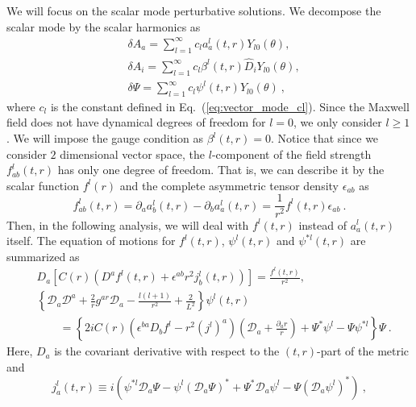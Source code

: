 \documentclass[a4paper,11pt]{article}
\begin{document}
    We will focus on the scalar mode perturbative solutions. We decompose the scalar mode by the scalar harmonics as 
    \begin{align}
        \label{eq:scalar_mode_gauge_field}
        &\delta A_a
        =\sum_{l=1}^\infty c_l a_a^{l}(t,r) Y_{l0}(\theta),\\
        &\delta A_i = \sum_{l=1}^\infty c_l \beta^{l}(t,r) \hat{D}_i Y_{l0}(\theta),\label{eq:scalar_mode_beta}\\
        &\delta\Psi
        =\sum_{l=1}^\infty c_l \psi^{l}(t,r) Y_{l0}(\theta)\ ,
        \label{eq:scalar_mode_scalar_field}
    \end{align}
    where $c_l$ is the constant defined in Eq.~(\ref{eq:vector_mode_cl}). Since the Maxwell field does not have dynamical degrees of freedom for $l=0$, we only consider $l\geq 1$. We will impose the gauge condition as $\beta^{l}(t,r)=0$. 
    Notice that since we consider $2$ dimensional vector space, the $l$-component of the field strength $f^l_{ab}(t,r)$ has only one degree of freedom. That is, we can describe it by the scalar function $f^l(r)$ and the complete asymmetric tensor density $\epsilon_{ab}$ as
    \begin{equation}
    \label{eq:elemag_tensor_scalar}
        f^l_{ab}(t,r)
        = \partial_a a^l_b(t,r)-\partial_b a^l_a(t,r)
        =\frac{1}{r^2} f^l(t,r)\epsilon_{ab}\ .
    \end{equation}
    Then, in the following analysis, we will deal with $f^l(t,r)$ instead of $a_a^{l}(t,r)$ itself. The equation of motions for $f^l(t,r)$, $\psi^l(t,r)$ and $\psi^{*l}(t,r)$ are summarized as
    \begin{align}
        & D_a\left[C(r)\left(D^a f^l(t,r)+\epsilon^{ab}r^2 j^l_b(t,r) \right)\right]=\frac{f^l(t,r)}{r^2},\label{eq:scalar_mode_Maxwell_b} \\
        &\left\{
        \mathcal{D}_a\mathcal{D}^a + \frac{2}{r}g^{ar}\mathcal{D}_a - \frac{l(l+1)}{r^2} + \frac{2}{L^2}
        \right\}\psi^l(t,r) \nonumber\\
        &\qquad
        =\left\{
        2iC(r)\left(\epsilon^{ba}D_b f^l-r^2 (j^l)^a\right) \left(\mathcal{D}_a+\frac{\partial_a r}{r}\right)
        +\Psi^*\psi^l-\Psi\psi^{*l}\right\}\Psi\ .
        \label{eq:scalar_mode_KG}
    \end{align}
    Here, $D_a$ is the covariant derivative with respect to the $(t,r)$-part of the metric and  
    \begin{equation}
        \label{eq:scalar_mode_j_a}
        j^l_a(t,r) \equiv i\left(\psi^{*l}\mathcal{D}_a\Psi-\psi^l (\mathcal{D}_a\Psi)^*+\Psi^*\mathcal{D}_a\psi^l-\Psi(\mathcal{D}_a\psi^l)^*\right)\ ,
    \end{equation}
\end{document}
